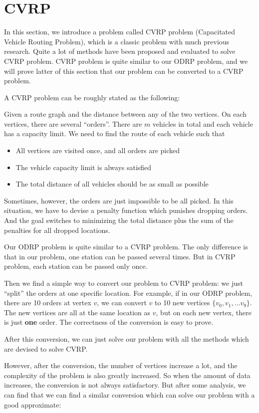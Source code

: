 \documentclass{llncs}
\begin{document}
\section{CVRP}
In this section, we introduce a problem called CVRP problem (Capacitated Vehicle Routing Problem), which is a classic problem with much previous research. Quite a lot of methods have been proposed and evaluated to solve CVRP problem. CVRP problem is quite similar to our ODRP problem, and we will prove latter of this section that our problem can be converted to a CVRP problem.

A CVRP problem can be roughly stated as the following:

Given a route graph and the distance between any of the two vertices. On each vertices, there are several ``orders''. There are $m$ vehicles in total and each vehicle has a capacity limit. We need to find the route of each vehicle such that 
\begin{itemize}
\item All vertices are visited once, and all orders are picked
\item The vehicle capacity limit is always satisfied
\item The total distance of all vehicles should be as small as possible
\end{itemize}

Sometimes, however, the orders are just impossible to be all picked. In this situation, we have to devise a penalty function which punishes dropping orders. And the goal switches to minimizing the total distance plus the sum of the penalties for all dropped locations.

Our ODRP problem is quite similar to a CVRP problem. The only difference is that in our problem, one station can be passed several times. But in CVRP problem, each station can be passed only once.

Then we find a simple way to convert our problem to CVRP problem: we just ``split'' the orders at one specific location. For example, if in our ODRP problem, there are 10 orders at vertex $v$, we can convert $v$ to 10 new vertices $\{v_{0}, v_{1}, \dots v_{9}\}$. The new vertices are all at the same location as $v$, but on each new vertex, there is just \textbf{one} order. The correctness of the conversion is easy to prove. 

After this conversion, we can just solve our problem with all the methods which are devised to solve CVRP. 

However, after the conversion, the number of vertices increase a lot, and the complexity of the problem is also greatly increased. So when the amount of data increases, the conversion is not always satisfactory. But after some analysis, we can find that we can find a similar conversion which can solve our problem with a good approximate:
\end{document}
